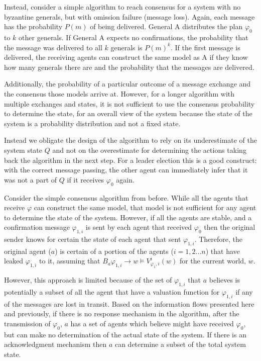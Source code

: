 Instead, consider a simple algorithm to reach consensus for a system with no byzantine generals, but with omission failure (message loss). Again, each message has the probability $P(m)$ of being delivered. General A distributes the plan $\varphi_0$ to $k$ other generals. If General A expects no confirmations, the probability that the message was delivered to all $k$ generals is $P(m)^k$. If the first message is delivered, the receiving agents can construct the same model as A if they know how many generals there are and the probability that the messages are delivered.



Additionally, the probability of a particular outcome of a message exchange and the consensus those models arrive at. However, for a longer algorithm with multiple exchanges and states, it is not sufficient to use the consensus probability to determine the state, for an overall view of the system because the state of the system is a probability distribution and not a fixed state.

Instead we obligate the design of the algorithm to rely on its underestimate of the system state $Q$ and not on the overestimate for determining the actions taking back the algorithm in the next step. For a leader election this is a good construct: with the correct message passing, the other agent can immediately infer that it was not a part of $Q$ if it receives $\varphi_0$ again. 

Consider the simple consensus algorithm from before. While all the agents that receive $\varphi$ can construct the same model, that model is not sufficient for any agent to determine the state of the system. However, if all the agents are stable, and a confirmation message $\varphi_{1,i}$ is sent by each agent that received $\varphi_0$ then the original sender knows for certain the state of each agent that sent $\varphi_{1,i}$. Therefore, the original agent ($a$) is certain of a portion of the agents ($i=1,2...n$) that have leaked $\varphi_{1,i}$ to it, assuming that $B_a \varphi_{1,i} \rightarrow w \vDash V_{\varphi_1,i}^i(w)$ for the current world, $w$.

However, this approach is limited because of the set of $\varphi_{1,i}$ that $a$ believes is potentially a subset of all the agent that have a valuation function for $\varphi_{1,i}$ if any of the messages are lost in transit. Based on the information flows presented here and previously, if there is no response mechanism in the algorithm, after the transmission of $\varphi_0$, $a$ has a set of agents which believe might have received $\varphi_0$, but can make no determination of the actual state of the system. If there is an acknowledgment mechanism then $a$ can determine a subset of the total system state. 

